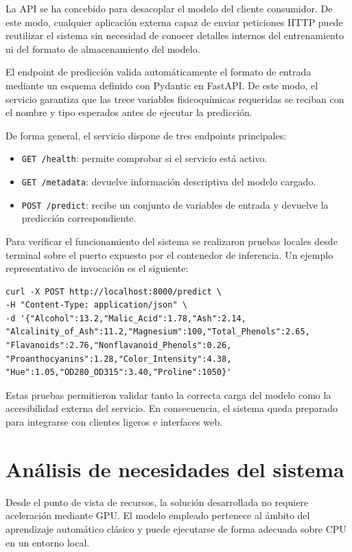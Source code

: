 La API se ha concebido para desacoplar el modelo del cliente consumidor. De este modo, cualquier aplicaci\'on externa capaz de enviar
peticiones HTTP puede reutilizar el sistema sin necesidad de conocer detalles internos del entrenamiento ni del formato de almacenamiento
del modelo.

El endpoint de predicci\'on valida autom\'aticamente el formato de entrada mediante un esquema definido con Pydantic en FastAPI.
De este modo, el servicio garantiza que las trece variables fisicoqu\'imicas requeridas se reciban con el nombre y tipo esperados antes de
ejecutar la predicci\'on.

De forma general, el servicio dispone de tres endpoints principales:

\begin{itemize}
    \item \texttt{GET /health}: permite comprobar si el servicio est\'a activo.
    \item \texttt{GET /metadata}: devuelve informaci\'on descriptiva del modelo cargado.
    \item \texttt{POST /predict}: recibe un conjunto de variables de entrada y devuelve la predicci\'on correspondiente.
\end{itemize}

Para verificar el funcionamiento del sistema se realizaron pruebas locales desde terminal sobre el puerto expuesto por el contenedor de
inferencia. Un ejemplo representativo de invocaci\'on es el siguiente:

\begin{verbatim}
curl -X POST http://localhost:8000/predict \
-H "Content-Type: application/json" \
-d '{"Alcohol":13.2,"Malic_Acid":1.78,"Ash":2.14,
"Alcalinity_of_Ash":11.2,"Magnesium":100,"Total_Phenols":2.65,
"Flavanoids":2.76,"Nonflavanoid_Phenols":0.26,
"Proanthocyanins":1.28,"Color_Intensity":4.38,
"Hue":1.05,"OD280_OD315":3.40,"Proline":1050}'
\end{verbatim}

Estas pruebas permitieron validar tanto la correcta carga del modelo como la accesibilidad externa del servicio. En consecuencia,
el sistema queda preparado para integrarse con clientes ligeros e interfaces web.

\section{An\'alisis de necesidades del sistema}

Desde el punto de vista de recursos, la soluci\'on desarrollada no requiere aceleraci\'on mediante GPU. El modelo empleado pertenece
al \'ambito del aprendizaje autom\'atico cl\'asico y puede ejecutarse de forma adecuada sobre CPU en un entorno local.

